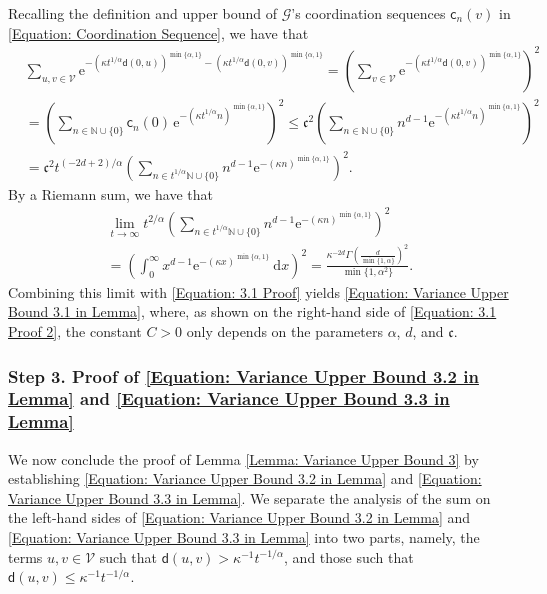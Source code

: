 \documentclass{amsart}
\numberwithin{equation}{section}
\theoremstyle{definition}
\newcommand\al{\alpha}
\newcommand\ka{\kappa}
\renewcommand\d{~\mathrm d}
\newcommand\mbb{\mathbb}
\newcommand\mf{\mathfrak}
\newcommand\mr{\mathrm}
\newcommand\ms{\mathscr}
\newcommand\msf{\mathsf}
\begin{document}
%

Recalling the definition and upper bound of $\ms G$'s coordination sequences $\msf c_n(v)$ in
\eqref{Equation: Coordination Sequence}, we have that
\begin{align}
\label{Equation: 3.1 Proof}
\nonumber
&\sum_{u,v\in\ms V}\mr e^{-(\ka t^{1/\al}\msf d(0,u))^{\min\{\al,1\}}-(\ka t^{1/\al}\msf d(0,v))^{\min\{\al,1\}}}
=\left(\sum_{v\in\ms V}\mr e^{-(\ka t^{1/\al}\msf d(0,v))^{\min\{\al,1\}}}\right)^2\\
\nonumber
&=\left(\sum_{n\in\mbb N\cup\{0\}}\msf c_n(0)\,\mr e^{-(\ka t^{1/\al}n)^{\min\{\al,1\}}}\right)^2
\leq \mf c^2\left(\sum_{n\in\mbb N\cup\{0\}}n^{d-1}\mr e^{-(\ka t^{1/\al}n)^{\min\{\al,1\}}}\right)^2\\
&=\mf c^2t^{(-2d+2)/\al}\left(\sum_{n\in t^{1/\al}\mbb N\cup\{0\}}n^{d-1}\mr e^{-(\ka n)^{\min\{\al,1\}}}\right)^2.
\end{align}
By a Riemann sum, we have that
\begin{multline}
\label{Equation: 3.1 Proof 2}
\lim_{t\to\infty}t^{2/\al}\left(\sum_{n\in t^{1/\al}\mbb N\cup\{0\}}n^{d-1}\mr e^{-(\ka n)^{\min\{\al,1\}}}\right)^2\\
=\left(\int_0^\infty x^{d-1}\mr e^{-(\ka x)^{\min\{\al,1\}}}\d x\right)^2
=\frac{\ka^{-2 d} \Gamma \left(\frac{d}{\min\{1,\al\}}\right)^2}{\min\{1,\al^2\}}.
\end{multline}
Combining this limit with \eqref{Equation: 3.1 Proof}
yields \eqref{Equation: Variance Upper Bound 3.1 in Lemma}, where, as shown
on the right-hand side of \eqref{Equation: 3.1 Proof 2}, the constant $C>0$
only depends on the parameters $\al$, $d$, and $\mf c$.

%

\subsubsection{Step 3. Proof of \eqref{Equation: Variance Upper Bound 3.2 in Lemma} and \eqref{Equation: Variance Upper Bound 3.3 in Lemma}}

%

We now conclude the proof of Lemma \ref{Lemma: Variance Upper Bound 3} by establishing
\eqref{Equation: Variance Upper Bound 3.2 in Lemma} and \eqref{Equation: Variance Upper Bound 3.3 in Lemma}.
We separate the analysis of the sum on the left-hand sides of
\eqref{Equation: Variance Upper Bound 3.2 in Lemma} and \eqref{Equation: Variance Upper Bound 3.3 in Lemma}
into two parts, namely, the terms $u,v\in\ms V$ such that $\msf d(u,v)>\ka^{-1}t^{-1/\al}$, and those such that
$\msf d(u,v)\leq\ka^{-1}t^{-1/\al}$.
\end{document}
